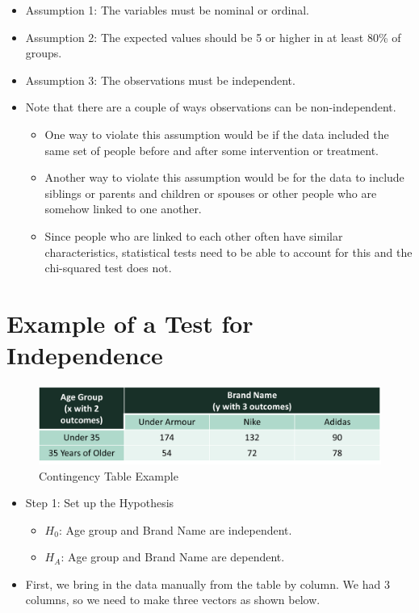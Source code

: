 \documentclass[
  letterpaper,
  DIV=11,
  numbers=noendperiod]{scrreprt}
\providecommand{\tightlist}{%
  \setlength{\itemsep}{0pt}\setlength{\parskip}{0pt}}\usepackage{longtable,booktabs,array}
\begin{document}
\begin{itemize}
\item
  Assumption 1: The variables must be nominal or ordinal.
\item
  Assumption 2: The expected values should be 5 or higher in at least
  80\% of groups.
\item
  Assumption 3: The observations must be independent.
\item
  Note that there are a couple of ways observations can be
  non-independent.

  \begin{itemize}
  \tightlist
  \item
    One way to violate this assumption would be if the data included the
    same set of people before and after some intervention or treatment.
  \item
    Another way to violate this assumption would be for the data to
    include siblings or parents and children or spouses or other people
    who are somehow linked to one another.
  \item
    Since people who are linked to each other often have similar
    characteristics, statistical tests need to be able to account for
    this and the chi-squared test does not.
  \end{itemize}
\end{itemize}

\section{Example of a Test for
Independence}\label{example-of-a-test-for-independence}

\begin{figure}[H]

{\centering \includegraphics{Pictures/Ch5/ContTableEx.png}

}

\caption{Contingency Table Example}

\end{figure}%

\begin{itemize}
\tightlist
\item
  Step 1: Set up the Hypothesis

  \begin{itemize}
  \tightlist
  \item
    \(H_0\): Age group and Brand Name are independent.
  \item
    \(H_A\): Age group and Brand Name are dependent.
  \end{itemize}
\item
  First, we bring in the data manually from the table by column. We had
  3 columns, so we need to make three vectors as shown below.
\end{itemize}
\end{document}
